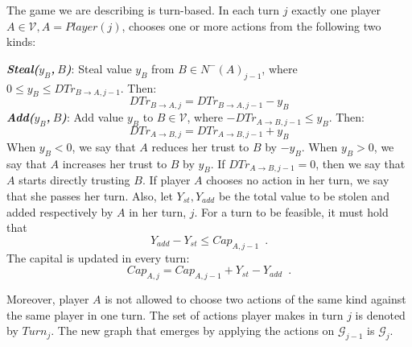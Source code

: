 \begin{definition}[Turns]
   The game we are describing is turn-based. In each turn $j$ exactly one player $A \in \mathcal{V}, A =
   Player\left(j\right)$, chooses one or more actions from the following two kinds:

   \noindent \textit{\textbf{Steal($y_B$,$\:B$)}}: Steal value $y_B$ from $B \in N^{-}\left(A\right)_{j-1}$, where
   $0 \leq y_B \leq DTr_{B \rightarrow A, j-1}$. Then:
   \begin{equation*}
      DTr_{B \rightarrow A, j} = DTr_{B \rightarrow A, j-1} - y_B
   \end{equation*}
   \noindent \textit{\textbf{Add($y_B$,$\:B$)}}:
   Add value $y_B$ to $B \in \mathcal{V}$, where $-DTr_{A \rightarrow B, j-1} \leq y_B$. Then:
   \begin{equation*}
      DTr_{A \rightarrow B, j} = DTr_{A \rightarrow B, j-1} + y_B
   \end{equation*}
   When $y_B < 0$, we say that $A$ reduces her trust to $B$ by $-y_B$. When $y_B > 0$, we say that $A$ increases her
   trust to $B$ by $y_B$. If $DTr_{A \rightarrow B, j-1} = 0$, then we say that $A$ starts directly trusting $B$.
   If player $A$ chooses no action in her turn, we say that she passes her turn. Also, let $Y_{st}, Y_{add}$ be the
   total value to be stolen and added respectively by $A$ in her turn, $j$. For a turn to be feasible, it must hold that
   \begin{equation}
      Y_{add} - Y_{st} \leq Cap_{A, j-1} \enspace.
   \end{equation}
   The capital is updated in every turn:
   \begin{equation*}
      Cap_{A, j} = Cap_{A, j-1} + Y_{st} - Y_{add} \enspace.
   \end{equation*}

   Moreover, player $A$ is not allowed to choose two actions of the same kind against the same player in one turn.
   The set of actions player makes in turn $j$ is denoted by $Turn_j$. The new graph that emerges by applying
   the actions on $\mathcal{G}_{j-1}$ is $\mathcal{G}_j$.
\end{definition}
